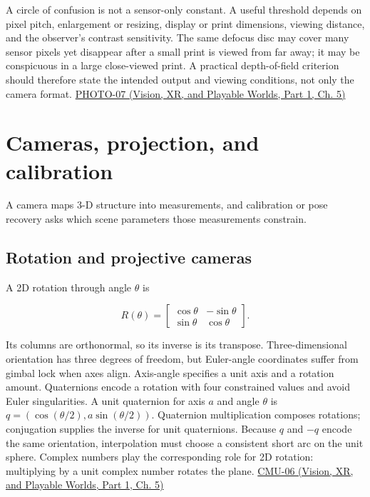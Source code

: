 \hypertarget{03-visual-computing-i-ch003-a-blur-threshold-depends-on-the-intended-view}{}

A circle of confusion is not a sensor-only constant. A useful threshold depends on pixel pitch, enlargement or resizing, display or print dimensions, viewing distance, and the observer's contrast sensitivity. The same defocus disc may cover many sensor pixels yet disappear after a small print is viewed from far away; it may be conspicuous in a large close-viewed print. A practical depth-of-field criterion should therefore state the intended output and viewing conditions, not only the camera format. \href{../07-Vision-XR-and-Playable-Worlds-P01/main.pdf\#nameddest=04-visual-computing-ii-ch036-photo-07---photography-session-07}{PHOTO-07 (Vision, XR, and Playable Worlds, Part 1, Ch. 5)}

\section{Cameras, projection, and calibration}\label{03-visual-computing-i-ch003-cameras-projection-and-calibration}

\hypertarget{03-visual-computing-i-ch003-cameras-projection-and-calibration}{}

A camera maps 3-D structure into measurements, and calibration or pose recovery asks which scene parameters those measurements constrain.

\subsection{Rotation and projective cameras}\label{03-visual-computing-i-ch003-rotation-and-projective-cameras}

\hypertarget{03-visual-computing-i-ch003-rotation-and-projective-cameras}{}

A 2D rotation through angle \(\theta\) is

\[
R(\theta)=\begin{bmatrix}\cos\theta&-\sin\theta\\\sin\theta&\cos\theta\end{bmatrix}.
\]

Its columns are orthonormal, so its inverse is its transpose. Three-dimensional orientation has three degrees of freedom, but Euler-angle coordinates suffer from gimbal lock when axes align. Axis-angle specifies a unit axis and a rotation amount. Quaternions encode a rotation with four constrained values and avoid Euler singularities. A unit quaternion for axis \(a\) and angle \(\theta\) is \(q=(\cos(\theta/2),a\sin(\theta/2))\). Quaternion multiplication composes rotations; conjugation supplies the inverse for unit quaternions. Because \(q\) and \(-q\) encode the same orientation, interpolation must choose a consistent short arc on the unit sphere. Complex numbers play the corresponding role for 2D rotation: multiplying by a unit complex number rotates the plane. \href{../07-Vision-XR-and-Playable-Worlds-P01/main.pdf\#nameddest=04-visual-computing-ii-ch036-cmu-06---3d-rotations-and-complex-representations}{CMU-06 (Vision, XR, and Playable Worlds, Part 1, Ch. 5)}

